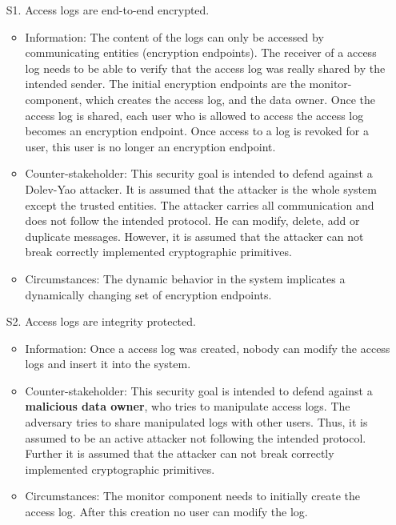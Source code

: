 \documentclass[../main.tex]{subfiles}
\begin{document}
\begin{enumerate}
    \item [S1.] Access logs are end-to-end encrypted.
    \begin{itemize}
        \item Information: 
        The content of the logs can only be accessed by communicating entities (encryption endpoints).
        The receiver of a access log needs to be able to verify that the access log was really shared by the intended sender. 
        The initial encryption endpoints are the monitor-component, which creates the access log, and the data owner.
        Once the access log is shared, each user who is allowed to access the access log becomes an encryption endpoint.
        Once access to a log is revoked for a user, this user is no longer an encryption endpoint.
        \item Counter-stakeholder:
        This security goal is intended to defend against a Dolev-Yao attacker.
        It is assumed that the attacker is the whole system except the trusted entities.
        The attacker carries all communication and does not follow the intended protocol.
        He can modify, delete, add or duplicate messages.
        However, it is assumed that the attacker can not break correctly implemented cryptographic primitives. 
        \item Circumstances: 
        The dynamic behavior in the system implicates a dynamically changing set of encryption endpoints.
    \end{itemize}
    \item [S2.] Access logs are integrity protected.
    \begin{itemize}
        \item Information: 
        Once a access log was created, nobody can modify the access logs and insert it into the system.
        \item Counter-stakeholder: 
        This security goal is intended to defend against a \textbf{malicious data owner}, who tries to manipulate access logs. 
        The adversary tries to share manipulated logs with other users.
        Thus, it is assumed to be an active attacker not following the intended protocol.
        Further it is assumed that the attacker can not break correctly implemented cryptographic primitives.
        \item Circumstances: 
        The monitor component needs to initially create the access log. 
        After this creation no user can modify the log. 
    \end{itemize}
\end{enumerate}
\end{document}
